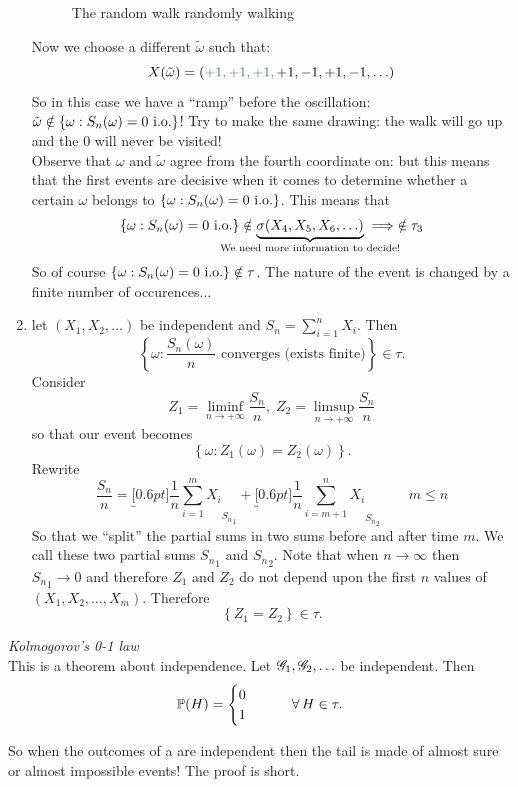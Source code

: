 \documentclass{report}
\begin{document}
\begin{example}
\begin{enumerate}[\circnum]
\begin{figure}[H]
			\caption{The random walk randomly walking}
			\label{fig:screenshot006}
		\end{figure}
		Now we choose a different $\tilde{\omega}$ such that:
		\[X(\tilde{\omega})=(\color{SkyBlue4}+1,+1,+1,\color{black}+1,-1,+1,-1,\ldots)\]
		So in this case we have a ``ramp'' before the oscillation: $\tilde{\omega}\notin\left\{\omega:S_n(\omega)=0\text{ i.o.}\right\}$! Try to make the same drawing: the walk will go up and the 0 will never be visited!\\
		Observe that $\omega$ and $\tilde{\omega}$ agree from the fourth coordinate on: but this means that the first events are decisive when it comes to determine whether a certain $\omega$ belongs to $\left\{\omega:S_n(\omega)=0\text{ i.o.}\right\}$. This means that
		\[\left\{\omega:S_n(\omega)=0\io\right\}\notin\underbrace{\sigma(X_4,X_5,X_6,\ldots)}_{\mathclap{\text{\scriptsize We need more information to decide!}}}\implies\notin\tau_3\]
		So of course $\left\{\omega:S_n(\omega)=0\text{ i.o.}\right\}\notin\tau$. The nature of the event is changed by a finite number of occurences...
		\item let $(X_1,X_2,\ldots)$ be independent and $S_n=\sum_{i=1}^{n}X_i$. Then
		\[\left\{\omega:\frac{S_n(\omega)}{n}\text{ converges (exists finite)}\right\}\in\tau.\]
		Consider 
		\[Z_1=\liminf_{n\to+\infty}\frac{S_n}{n},\;Z_2=\limsup_{n\to+\infty}\frac{S_n}{n}\]
		so that our event becomes
		\[\left\{\omega:Z_1(\omega)=Z_2(\omega)\right\}.\]
		Rewrite 
		\[ \frac{S_n}{n}=\underbracket[0.6pt]{\frac{1}{n}\sum_{i=1}^{m}X_i}_{{S_n}_1}+\underbracket[0.6pt]{\frac{1}{n}\sum_{i=m+1}^{n}X_i}_{{S_n}_2}\qquad m\leq n\]
		So that we ``split'' the partial sums in two sums before and after time $m$. We call these two partial sums ${S_n}_1$ and ${S_n}_2$. Note that when $n\to\infty$ then ${S_n}_1\to0$ and therefore $Z_1$ and $Z_2$ do not depend upon the first $n$ values of $(X_1,X_2,\ldots,X_m)$. Therefore 
		\[\left\{Z_1=Z_2\right\}\in\tau.\]
 	\end{enumerate}
\end{example}
\begin{theorem}
	\emph{Kolmogorov's 0-1 law}\\
	This is a theorem about independence. Let $\mathscr{G}_1,\mathscr{G}_2,\ldots$ be independent. Then
	\[\mathbb{P}(H)=\begin{cases}
		0\\
		1
	\end{cases}\qquad\forall\, H\in\tau.\]
\end{theorem}
So when the outcomes of a \rv{} are independent then the tail is made of almost sure or almost impossible events! The proof is short.
\end{document}
